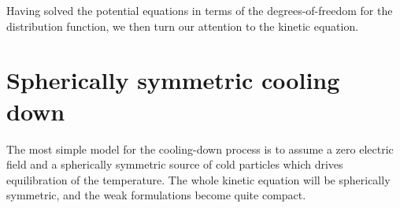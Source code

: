 \documentclass[reprint]{revtex4}
\begin{document}
Having solved the potential equations in terms of the degrees-of-freedom for the distribution function, we then turn our attention to the kinetic equation.


\section{Spherically symmetric cooling down}
The most simple model for the cooling-down process is to assume a zero electric field and a spherically symmetric source of cold particles which drives equilibration of the temperature. The whole kinetic equation will be spherically symmetric, and the weak formulations become quite compact. 
\end{document}
